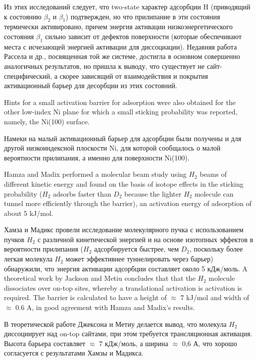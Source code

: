 \documentclass[11pt]{article}
\begin{document}
Из этих исследований следует, что two-state характер адсорбции H
(приводящий к состоянию \(\beta_2\) и \(\beta_1\)) подтвержден, но что
прилипание в эти состояния термически активировано, причем энергия
активации низкоэнергетического состояния \(\beta_1\) сильно зависит от
дефектов поверхности (которые обеспечивают места с исчезающей энергией
активации для диссоциации). Недавняя работа Рассела и др., посвященная
той же системе, достигла в основном совершенно аналогичных результатов,
но пришла к выводу, что существует не сайт-специфический, а скорее
зависящий от взаимодействия и покрытия активационный барьер для
десорбции из этих состояний.

Hints for a small activation barrier for adsorption were also obtained
for the other low-index Ni plane for which a small sticking probability
was reported, namely, the Ni(100) surface.

Намеки на малый активационный барьер для адсорбции были получены и для
другой низкоиндексной плоскости Ni, для которой сообщалось о малой
вероятности прилипания, а именно для поверхности Ni(100).

Hamza and Madix performed a molecular beam study using \(H_2\) beams of
different kinetic energy and found on the basis of isotope effects in
the sticking probability (\(H_2\) adsorbs faster than \(D_2\) because
the lighter \(H_2\) molecule can tunnel more efficiently through the
barrier), an activation energy of adsorption of about 5 kJ/mol.

Хамза и Мадикс провели исследование молекулярного пучка с использованием
пучков \(H_2\) с различной кинетической энергией и на основе изотопных
эффектов в вероятности прилипания (\(H_2\) адсорбируется быстрее, чем
\(D_2\), поскольку более легкая молекула \(H_2\) может эффективнее
туннелировать через барьер) обнаружили, что энергия активации адсорбции
составляет около 5 кДж/моль. A theoretical work by Jackson and Metiu
concludes that that the \(H_2\) molecule dissociates over on-top sites,
whereby a translational activation is activation is required. The
barrier is calculated to have a height of \(\approx\) 7 kJ/mol and width
of \(\approx\) 0.6 A, in good agreement with Hamza and Madix's results.

В теоретической работе Джексона и Метиу делается вывод, что молекула
\(H_2\) диссоциирует над on-top сайтами, при этом требуется
трансляционная активация. Высота барьера составляет \(\approx\) 7
кДж/моль, а ширина \(\approx\) 0,6 А, что хорошо согласуется с
результатами Хамзы и Мадикса.
\end{document}
